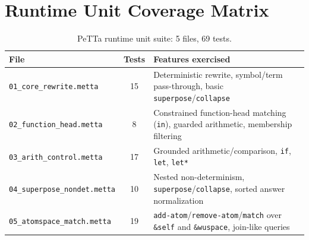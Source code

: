 \documentclass[]{article}
\newcommand{\code}[1]{\texttt{#1}}
\newcommand{\PeTTa}{\textup{PeTTa}}
\begin{document}
\section{Runtime Unit Coverage Matrix}
\label{app:runtime-unit-matrix}

\begin{table}[H]
\centering
\scriptsize
\begin{tabularx}{\linewidth}{YcY}
\hline
\textbf{File} & \textbf{Tests} & \textbf{Features exercised} \\
\hline
\code{01\_core\_rewrite.metta} & 15 &
Deterministic rewrite, symbol/term pass-through,
basic \code{superpose}/\code{collapse} \\
\code{02\_function\_head.metta} & 8 &
Constrained function-head matching (\code{in}), guarded arithmetic,
membership filtering \\
\code{03\_arith\_control.metta} & 17 &
Grounded arithmetic/comparison, \code{if}, \code{let}, \code{let*} \\
\code{04\_superpose\_nondet.metta} & 10 &
Nested non-determinism, \code{superpose}/\code{collapse},
sorted answer normalization \\
\code{05\_atomspace\_match.metta} & 19 &
\code{add-atom}/\code{remove-atom}/\code{match} over
\code{\&self} and \code{\&wuspace}, join-like queries \\
\hline
\end{tabularx}
\normalsize
\caption{\PeTTa{} runtime unit suite: 5 files, 69 tests.}
\label{tab:petta-runtime-unit-matrix}
\end{table}



\end{document}

